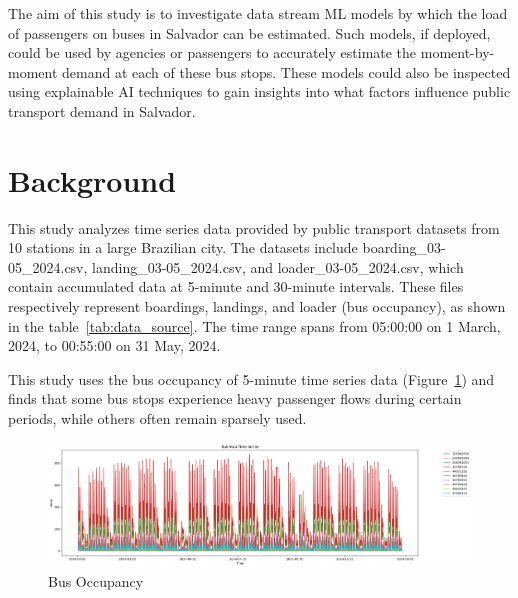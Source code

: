 \documentclass[11pt]{article} %
\begin{document}
The aim of this study is to investigate data stream ML models by which the load of passengers on buses in Salvador can be estimated. Such models, if deployed, could be used by agencies or passengers to accurately estimate the moment-by-moment demand at each of these bus stops. These models could also be inspected using explainable AI techniques to gain insights into what factors influence public transport demand in Salvador.

\section{Background}
This study analyzes time series data provided by public transport datasets from 10 stations in a large Brazilian city. The datasets include boarding\_03-05\_2024.csv, landing\_03-05\_2024.csv, and loader\_03-05\_2024.csv, which contain accumulated data at 5-minute and 30-minute intervals. These files respectively represent boardings, landings, and loader (bus occupancy), as shown in the table~\ref{tab:data_source}. The time range spans from 05:00:00 on 1 March, 2024, to 00:55:00 on 31 May, 2024.

\begin{table}[H]
	\centering
	\caption{Data Source}
	\label{tab:data_source}
\end{table}

This study uses the bus occupancy of 5-minute time series data (Figure~\ref{fig:loader}) and finds that some bus stops experience heavy passenger flows during certain periods, while others often remain sparsely used.

\begin{figure}[H]
	\centering
	\caption{Bus Occupancy}
	\label{fig:loader}
	\includegraphics[scale=0.3]{loader}
\end{figure}
\end{document}
